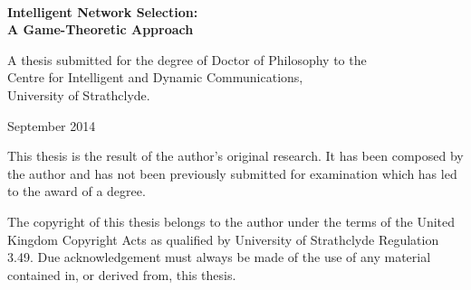 \begin{titlepage}

\vspace*{2.2cm}

\\[1ex]
{\bf\sffamily\Huge Intelligent Network Selection:}\\[1ex]
{\bf\sffamily\Huge A Game-Theoretic Approach}

\par
\vspace{2cm}


\par
\vspace{6.5cm}

\noindent A thesis submitted for the degree of Doctor of Philosophy to the \\Centre for Intelligent and Dynamic Communications,\\ University of Strathclyde.

\par
\vspace{1cm}

\noindent September 2014

\cleardoublepage


\vspace*{2.2cm}

\noindent This thesis is the result of the author's original research. It has been composed by the author and has not been previously submitted for examination which has led to the award of a degree.

\cleardoublepage

\vspace*{2.2cm}

\noindent The copyright of this thesis belongs to the author under the terms of the United Kingdom Copyright Acts as qualified by University of Strathclyde Regulation 3.49. Due acknowledgement must always be made of the use of any material contained in, or derived from, this thesis.

\cleardoublepage
\end{titlepage}